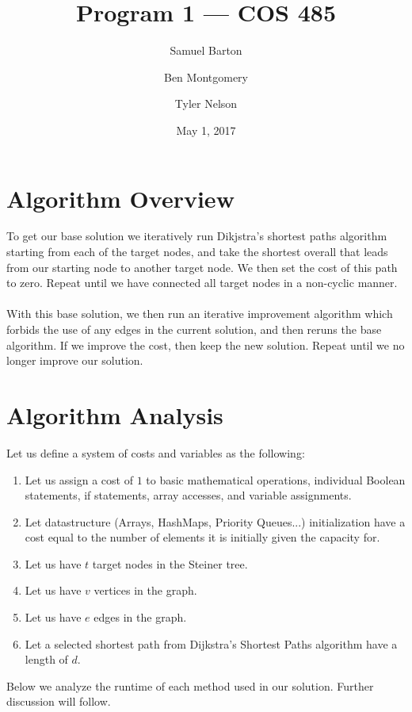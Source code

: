 \documentclass[12pt]{article}
\begin{document}
\title{Program 1 --- COS 485}
\author{Samuel Barton \and Ben Montgomery \and Tyler Nelson}
\date{May 1, 2017}
 
\maketitle
\section{Algorithm Overview}

To get our base solution
we iteratively run Dikjstra's shortest paths algorithm starting from each of the
target nodes, and take the shortest overall that leads from our starting node to
another target node. We then set the cost of this path to zero. Repeat until we
have connected all target nodes in a non-cyclic manner.
\\
\\
With this base solution, we then run an iterative improvement algorithm which 
forbids the use of any edges in the current solution, and then reruns the base
algorithm. If we improve the cost, then keep the new solution. Repeat until
we no longer improve our solution.

\section{Algorithm Analysis}

Let us define a system of costs and variables as the following:
\begin{enumerate}
    \item Let us assign a cost of $1$ to basic mathematical operations, individual Boolean statements, if statements, array accesses, and variable assignments.
    \item Let datastructure (Arrays, HashMaps, Priority Queues...) initialization have a cost equal to the number of elements it is initially given the capacity for.
    \item Let us have $t$ target nodes in the Steiner tree.
    \item Let us have $v$ vertices in the graph.
    \item Let us have $e$ edges in the graph.
    \item Let a selected shortest path from Dijkstra's Shortest Paths algorithm have a length of $d$.
\end{enumerate}

Below we analyze the runtime of each method used in our solution. Further 
discussion will follow.
\end{document}
